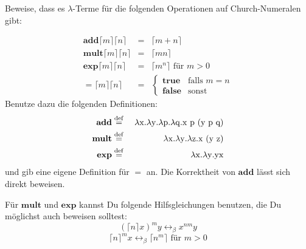 \begin{aufgabe}\label{ex:church}
  Beweise, dass es $\lambda$-Terme für die folgenden
  Operationen auf Church-Numeralen gibt:
  
  \begin{eqnarray*}
    \mathbf{add} \lceil m\rceil \lceil n\rceil &=& \lceil m+n\rceil
    \\
    \mathbf{mult} \lceil m\rceil \lceil n\rceil &=& \lceil mn\rceil
    \\
    \mathbf{exp} \lceil m\rceil \lceil n\rceil &=& \lceil m^n\rceil
    \textrm{ für } m>0\\
    \mathbf{=}\lceil m\rceil \lceil n\rceil &=&
    \begin{cases}
      \mathbf{true} & \text{falls } m = n\\
      \mathbf{false} & \text{sonst}
    \end{cases}
  \end{eqnarray*}
  Benutze dazu die folgenden Definitionen:
  \begin{eqnarray*}
    \mathbf{add} &\stackrel{\rm def}{=}{}& \lambda \mathrm x.\lambda \mathrm y.\lambda \mathrm p.\lambda \mathrm q.\mathrm x~\mathrm p~(\mathrm y~\mathrm p~\mathrm q)\\
    \mathbf{mult} &\stackrel{\rm def}{=}{}& \lambda \mathrm x.\lambda \mathrm y.\lambda \mathrm z.\mathrm x~(\mathrm y~\mathrm z)\\
    \mathbf{exp} &\stackrel{\rm def}{=}{}& \lambda \mathrm x.\lambda \mathrm y.\mathrm y\mathrm x
  \end{eqnarray*}
  und gib eine eigene Definition für $=$ an.
  Die Korrektheit von $\mathbf{add}$ lässt sich direkt beweisen.

  Für $\mathbf{mult}$ und $\mathbf{exp}$ kannst Du
  folgende Hilfsgleichungen benutzen, die Du möglichst auch beweisen solltest:
  \begin{displaymath}
    (\lceil n\rceil x)^m y \leftrightarrow_{\beta} x^{nm} y
  \end{displaymath}
  \begin{displaymath}
    \label{eq:lem-2}
    \lceil n\rceil^m x \leftrightarrow_{\beta} \lceil n^m\rceil
    \textrm{ für } m>0
  \end{displaymath}
\end{aufgabe}
